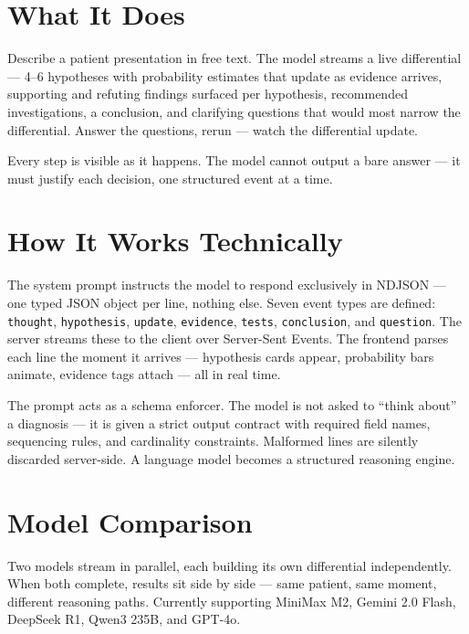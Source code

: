 \documentclass[11pt, a4paper]{article}
\begin{document}
\section{What It Does}

Describe a patient presentation in free text. The model streams a live differential — 4--6 hypotheses with probability estimates that update as evidence arrives, supporting and refuting findings surfaced per hypothesis, recommended investigations, a conclusion, and clarifying questions that would most narrow the differential. Answer the questions, rerun — watch the differential update.

Every step is visible as it happens. The model cannot output a bare answer — it must justify each decision, one structured event at a time.

\section{How It Works Technically}

The system prompt instructs the model to respond exclusively in NDJSON — one typed JSON object per line, nothing else. Seven event types are defined: \texttt{thought}, \texttt{hypothesis}, \texttt{update}, \texttt{evidence}, \texttt{tests}, \texttt{conclusion}, and \texttt{question}. The server streams these to the client over Server-Sent Events. The frontend parses each line the moment it arrives — hypothesis cards appear, probability bars animate, evidence tags attach — all in real time.

The prompt acts as a schema enforcer. The model is not asked to ``think about'' a diagnosis — it is given a strict output contract with required field names, sequencing rules, and cardinality constraints. Malformed lines are silently discarded server-side. A language model becomes a structured reasoning engine.

\section{Model Comparison}

Two models stream in parallel, each building its own differential independently. When both complete, results sit side by side — same patient, same moment, different reasoning paths. Currently supporting MiniMax M2, Gemini 2.0 Flash, DeepSeek R1, Qwen3 235B, and GPT-4o.
\end{document}
